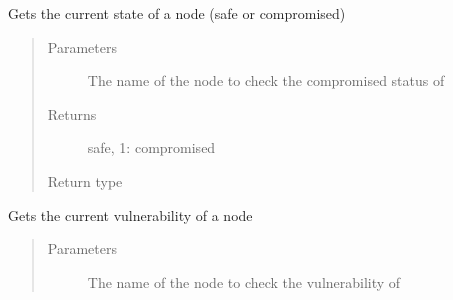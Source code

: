 \documentclass[letterpaper,10pt,english]{sphinxmanual}
\begin{document}
\begin{fulllineitems}
\begin{fulllineitems}
\begin{quote}
\begin{description}
\end{description}\end{quote}

\end{fulllineitems}


\begin{fulllineitems}
\label{\detokenize{source/yawning_titan.envs.generic.core:yawning_titan.envs.generic.core.network_interface.NetworkInterface.get_single_node_state}}
\sphinxAtStartPar
Gets the current state of a node (safe or compromised)
\begin{quote}\begin{description}
\item[{Parameters}] \leavevmode
\sphinxAtStartPar
{} \textendash{} The name of the node to check the compromised status of

\item[{Returns}] \leavevmode
\sphinxAtStartPar
safe, 1: compromised

\item[{Return type}] \leavevmode
{}

\end{description}\end{quote}

\end{fulllineitems}


\begin{fulllineitems}
\label{\detokenize{source/yawning_titan.envs.generic.core:yawning_titan.envs.generic.core.network_interface.NetworkInterface.get_single_node_vulnerability}}
\sphinxAtStartPar
Gets the current vulnerability of a node
\begin{quote}\begin{description}
\item[{Parameters}] \leavevmode
\sphinxAtStartPar
{} \textendash{} The name of the node to check the vulnerability of


\end{description}
\end{quote}
\end{fulllineitems}
\end{fulllineitems}
\end{document}
